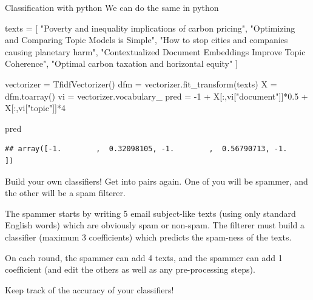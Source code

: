 \documentclass[
  10pt,
  ignorenonframetext,
  aspectratio=169]{beamer}
\newenvironment{Shaded}{\begin{snugshade}}{\end{snugshade}}
\newcommand{\DecValTok}[1]{\textcolor[rgb]{0.86,0.86,0.80}{#1}}
\newcommand{\FloatTok}[1]{\textcolor[rgb]{0.75,0.75,0.82}{#1}}
\newcommand{\NormalTok}[1]{\textcolor[rgb]{0.80,0.80,0.80}{#1}}
\newcommand{\OperatorTok}[1]{\textcolor[rgb]{0.94,0.94,0.82}{#1}}
\newcommand{\StringTok}[1]{\textcolor[rgb]{0.80,0.58,0.58}{#1}}
\begin{document}
\begin{frame}[fragile]{Classification with python}
\protect\hypertarget{classification-with-python}{}
We can do the same in python

\scriptsize

\begin{Shaded}
\begin{Highlighting}[]
\NormalTok{texts }\OperatorTok{=}\NormalTok{ [}
  \StringTok{"Poverty and inequality implications of carbon pricing"}\NormalTok{,}
  \StringTok{"Optimizing and Comparing Topic Models is Simple"}\NormalTok{,}
  \StringTok{"How to stop cities and companies causing planetary harm"}\NormalTok{,}
  \StringTok{"Contextualized Document Embeddings Improve Topic Coherence"}\NormalTok{,}
  \StringTok{"Optimal carbon taxation and horizontal equity"}
\NormalTok{]}

\NormalTok{vectorizer }\OperatorTok{=}\NormalTok{ TfidfVectorizer()}
\NormalTok{dfm }\OperatorTok{=}\NormalTok{ vectorizer.fit\_transform(texts)}
\NormalTok{X }\OperatorTok{=}\NormalTok{ dfm.toarray()}
\NormalTok{vi }\OperatorTok{=}\NormalTok{ vectorizer.vocabulary\_}
\NormalTok{pred }\OperatorTok{=} \OperatorTok{{-}}\DecValTok{1} \OperatorTok{+}\NormalTok{ X[:,vi[}\StringTok{"document"}\NormalTok{]]}\OperatorTok{*}\FloatTok{0.5} \OperatorTok{+}\NormalTok{ X[:,vi[}\StringTok{"topic"}\NormalTok{]]}\OperatorTok{*}\DecValTok{4}

\NormalTok{pred}
\end{Highlighting}
\end{Shaded}

\begin{verbatim}
## array([-1.        ,  0.32098105, -1.        ,  0.56790713, -1.        ])
\end{verbatim}
\end{frame}

\begin{frame}{Build your own classifiers!}
\protect\hypertarget{build-your-own-classifiers}{}
Get into pairs again. One of you will be spammer, and the other will be
a spam filterer.

The spammer starts by writing 5 email subject-like texts (using only
standard English words) which are obviously spam or non-spam. The
filterer must build a classifier (maximum 3 coefficients) which predicts
the spam-ness of the texts.

On each round, the spammer can add 4 texts, and the spammer can add 1
coefficient (and edit the others as well as any pre-processing steps).

Keep track of the accuracy of your classifiers!
\end{frame}
\end{document}
